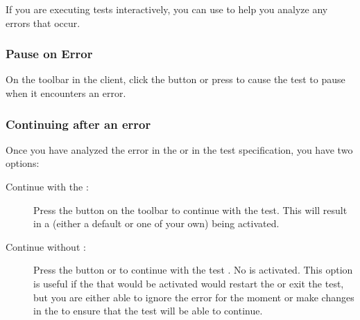 
If you are executing tests interactively, you can use \app{} to help you analyze any errors that occur.

\subsubsection{Pause on Error}
On the toolbar in the \app{} client, click the  button
or press  to cause the test to pause when it encounters an error. 


\subsubsection{Continuing after an error}
Once you have analyzed the error in the \gdaut{} or in the test specification, you have two options:

\begin{description}
\item [Continue with the \gdehandler{}:]{Press the  button on the toolbar  to continue with the test. This will result in a \gdehandler{} (either a default \gdehandler{} or one of your own) being activated.}
\item [Continue without \gdehandler{}:]{Press the  button or  to continue with the test . No \gdehandler{} is activated. This option is useful if the \gdehandler{} that would be activated would restart the \gdaut{} or exit the test, but you are either able to ignore the error for the moment or make changes in the \gdaut{} to ensure that the test will be able to continue. }
\end{description}
